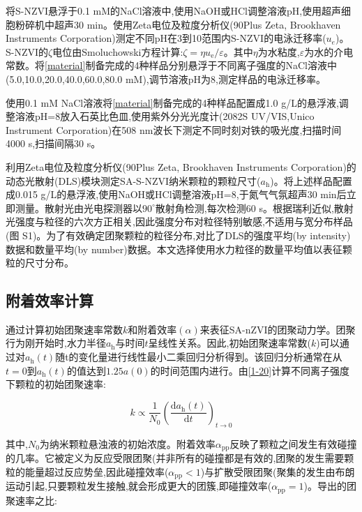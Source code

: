 将S-NZVI悬浮于0.1 mM的NaCl溶液中,使用NaOH或HCl调整溶液pH,使用超声细胞粉碎机中超声30 min。使用Zeta电位及粒度分析仪(90Plus Zeta, Brookhaven Instruments Corporation)测定不同pH在3到10范围内S-NZVI的电泳迁移率($u_e$)。S-NZVI的$\zeta$电位由Smoluchowski方程计算:$\zeta=\eta u_\mathrm{e}/\varepsilon$。其中$\eta$为水粘度,$\varepsilon$为水的介电常数。将\cref{material}制备完成的4种样品分别悬浮于不同离子强度的NaCl溶液中(5.0,10.0,20.0,40.0,60.0,80.0 mM),调节溶液pH为8,测定样品的电泳迁移率。

使用0.1 mM NaCl溶液将\cref{material}制备完成的4种样品配置成1.0 g/L的悬浮液,调整溶液pH=8放入石英比色皿,使用紫外分光光度计(2082S UV/VIS,Unico Instrument Corporation)在508 nm波长下测定不同时刻对铁的吸光度,扫描时间4000 s,扫描间隔30 s。
    
利用Zeta电位及粒度分析仪(90Plus Zeta, Brookhaven Instruments Corporation)的动态光散射(DLS)模块测定SA-S-NZVI纳米颗粒的颗粒尺寸($a_\mathrm{h}$)。将上述样品配置成0.015 g/L的悬浮液,使用NaOH或HCl调整溶液pH=8,于氮气气氛超声30 min后立即测量。散射光由光电探测器以$90^\circ$散射角检测,每次检测60 s。根据瑞利近似,散射光强度与粒径的六次方正相关,因此强度分布对粒径特别敏感,不适用与宽分布样品(图 S1)。为了有效确定团聚颗粒的粒径分布,对比了DLS的强度平均(by intensity)数据和数量平均(by number)数据。本文选择使用水力粒径的数量平均值以表征颗粒的尺寸分布。


\subsection{附着效率计算}

通过计算初始团聚速率常数$k$和附着效率$(\alpha)$来表征SA-nZVI的团聚动力学。团聚行为刚开始时,水力半径$a_\mathrm{h}$与时间$t$呈线性关系。因此,初始团聚速率常数($k$)可以通过对$a_\mathrm{h}(t)$随t的变化量进行线性最小二乘回归分析得到。该回归分析通常在从$t = 0$到$a_\mathrm{h}(t)$的值达到$1.25a(0)$的时间范围内进行\cite{ChenElimelech-762}。由\cref{1-20}计算不同离子强度下颗粒的初始团聚速率\cite{ChenMylon-760}:

\begin{equation}\label{1-20}
    k\propto\frac{1}{N_0}\left(\frac{\mathrm{d}a_\mathrm{h}(t)}{\mathrm{d}t}\right)_{t\rightarrow0}
\end{equation}

其中,$N_0$为纳米颗粒悬浊液的初始浓度。附着效率$\alpha_{\mathrm {pp}}$反映了颗粒之间发生有效碰撞的几率。它被定义为反应受限团聚(并非所有的碰撞都是有效的,团聚的发生需要颗粒的能量超过反应势垒,因此碰撞效率($\alpha_\mathrm{pp}<1$)与扩散受限团聚(聚集的发生由布朗运动引起,只要颗粒发生接触,就会形成更大的团簇,即碰撞效率($\alpha_\mathrm{pp}=1$)。导出的团聚速率之比\cite{doi:10.1021/la062072v}:

